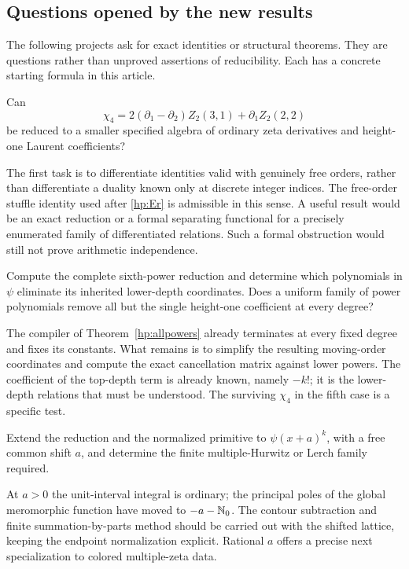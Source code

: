 \subsection{Questions opened by the new results}

The following projects ask for exact identities or structural theorems.
They are questions rather than unproved assertions of reducibility.
Each has a concrete starting formula in this article.

\begin{question}
Can
\[
 \chi_4=2(\partial_1-\partial_2)Z_2(3,1)+\partial_1Z_2(2,2)
\]
be reduced to a smaller specified algebra of ordinary zeta derivatives
and height-one Laurent coefficients?
\end{question}
The first task is to differentiate identities valid with genuinely free
orders, rather than differentiate a duality known only at discrete
integer indices. The free-order stuffle identity used after
\eqref{hp:Er} is admissible in this sense. A useful result would be an
exact reduction or a formal separating functional for a precisely
enumerated family of differentiated relations. Such a formal obstruction
would still not prove arithmetic independence.

\begin{question}
Compute the complete sixth-power reduction and determine which
polynomials in $\psi$ eliminate its inherited lower-depth coordinates.
Does a uniform family of power polynomials remove all but the single
height-one coefficient at every degree?
\end{question}
The compiler of Theorem~\ref{hp:allpowers} already terminates at every
fixed degree and fixes its constants. What remains is to simplify the
resulting moving-order coordinates and compute the exact cancellation
matrix against lower powers. The coefficient of the top-depth term is
already known, namely $-k!$; it is the lower-depth relations that must be
understood. The surviving $\chi_4$ in the fifth case is a specific test.

\begin{question}
Extend the reduction and the normalized primitive to
$\psi(x+a)^k$, with a free common shift $a$, and determine the finite
multiple-Hurwitz or Lerch family required.
\end{question}
At $a>0$ the unit-interval integral is ordinary; the principal poles of
the global meromorphic function have moved to $-a-\mathbb N_0$.
The contour subtraction and finite summation-by-parts method should be
carried out with the shifted lattice, keeping the endpoint normalization
explicit. Rational $a$ offers a precise next specialization to colored
multiple-zeta data.

